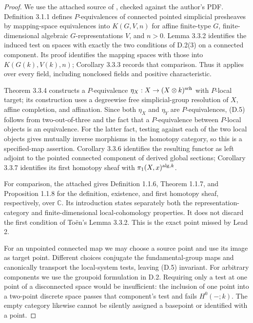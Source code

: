 \begin{proof}
We use the attached source of \citet{D_Toen2006}, checked against the
author's PDF. Definition 3.1.1 defines $P$-equivalences of connected
pointed simplicial presheaves by mapping-space equivalences into
$K(G,V,n)$ for affine finite-type $G$, finite-dimensional algebraic
$G$-representations $V$, and $n>0$. Lemma 3.3.2 identifies the induced
test on spaces with exactly the two conditions of D.2(3) on a
connected component. Its proof identifies the mapping spaces with
those into $K(G(k),V(k),n)$; Corollary 3.3.3 records that comparison.
Thus it applies over every field, including nonclosed fields and
positive characteristic.

Theorem 3.3.4 constructs a $P$-equivalence
$\eta_X:X\to(X\otimes k)^{\mathrm{sch}}$ with $P$-local target; its construction
uses a degreewise free simplicial-group resolution of $X$, affine
completion, and affination. Since both $\eta_X$ and $\eta_Y$ are
$P$-equivalences, (D.5) follows from two-out-of-three and the fact that
a $P$-equivalence between $P$-local objects is an equivalence. For the
latter fact, testing against each of the two local objects gives
mutually inverse morphisms in the homotopy category, so this is a
specified-map assertion. Corollary 3.3.6 identifies the resulting
functor as left adjoint to the pointed connected component of derived
global sections; Corollary 3.3.7 identifies its first homotopy sheaf
with $\pi_1(X,x)^{\mathrm{alg},k}$.

For comparison, the attached
\citet{D_KatzarkovPantevToen2008} gives Definition 1.1.6,
Theorem 1.1.7, and Proposition 1.1.8 for the definition, existence,
and first homotopy sheaf, respectively, over $\mathbb C$.
Its introduction states separately both the representation-category
and finite-dimensional local-cohomology properties. It does not
discard the first condition of To\"en's Lemma 3.3.2. This is the exact
point missed by Lead 2.

For an unpointed connected map we may choose a source point and use
its image as target point. Different choices conjugate the
fundamental-group maps and canonically transport the local-system
tests, leaving (D.5) invariant. For arbitrary components we use the
groupoid formulation in D.2. Requiring only a test at one point of a
disconnected space would be insufficient: the inclusion of one point
into a two-point discrete space passes that component's test and fails
$H^0(-;k)$. The empty category likewise cannot be silently assigned
a basepoint or identified with a point.
\end{proof}

